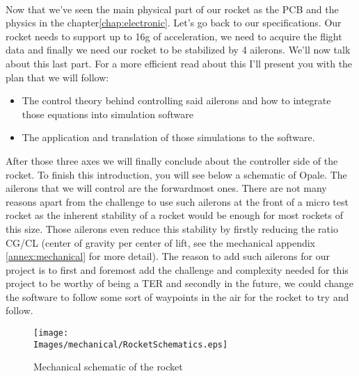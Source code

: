 \paragraph{}
Now that we've seen the main physical part of our rocket as the PCB and the
physics in the chapter\ref{chap:electronic}. Let's go back to our
specifications. Our rocket needs to support up to 16g of acceleration, we need
to acquire the flight data and finally we need our rocket to be stabilized by 4
ailerons. We'll now talk about this last part. For a more efficient read about
this I'll present you with the plan that we will follow:

\begin{itemize}
    \item The control theory behind controlling said ailerons and how to integrate those
          equations into simulation software
    \item The application and translation of those simulations to the software.
\end{itemize}

After those three axes we will finally conclude about the controller side of
the rocket.
To finish this introduction, you will see below a schematic of Opale. The
ailerons that we will control are the forwardmost ones. There are not many
reasons apart from the challenge to use such ailerons at the front of a micro
test rocket as the inherent stability of a rocket would be enough for most
rockets of this size. Those ailerons even reduce this stability by firstly
reducing the ratio CG/CL (center of gravity per center of lift, see the
mechanical appendix \ref{annex:mechanical} for more detail). The reason to add
such ailerons for our project is to first and foremost add the challenge and
complexity needed for this project to be worthy of being a TER and secondly in
the future, we could change the software to follow some sort of waypoints in
the air for the rocket to try and follow.

\begin{figure}[!hbt]
    \centering
    \texttt{[image: \\Images/mechanical/RocketSchematics.eps]}
    \caption{Mechanical schematic of the rocket}
\end{figure}
\FloatBarrier





